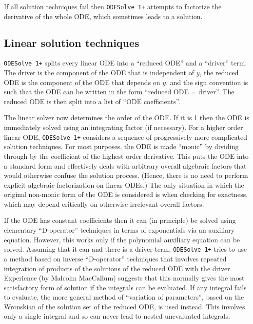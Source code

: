 \documentclass[a4paper]{article} %
\newcommand{\ODESolve}[1]{\texttt{ODESolve\,#1}}
\begin{document}
If all solution techniques fail then \ODESolve{1+} attempts to
factorize the derivative of the whole ODE, which sometimes leads to a
solution.


\subsection{Linear solution techniques}

\ODESolve{1+} splits every linear ODE into a ``reduced ODE'' and a
``driver'' term.  The driver is the component of the ODE that is
independent of $y$, the reduced ODE is the component of the ODE that
depends on $y$, and the sign convention is such that the ODE can be
written in the form ``reduced ODE = driver''.  The reduced ODE is then
split into a list of ``ODE coefficients''.

The linear solver now determines the order of the ODE\@.  If it is 1
then the ODE is immediately solved using an integrating factor (if
necessary).  For a higher order linear ODE, \ODESolve{1+} considers a
sequence of progressively more complicated solution techniques.  For
most purposes, the ODE is made ``monic'' by dividing through by the
coefficient of the highest order derivative.  This puts the ODE into a
standard form and effectively deals with arbitrary overall algebraic
factors that would otherwise confuse the solution process.  (Hence,
there is no need to perform explicit algebraic factorization on linear
ODEs.)  The only situation in which the original non-monic form of the
ODE is considered is when checking for exactness, which may depend
critically on otherwise irrelevant overall factors.

If the ODE has constant coefficients then it can (in principle) be
solved using elementary ``D-operator'' techniques in terms of
exponentials via an auxiliary equation.  However, this works only if
the polynomial auxiliary equation can be solved.  Assuming that it can
and there is a driver term, \ODESolve{1+} tries to use a method based
on inverse ``D-operator'' techniques that involves repeated
integration of products of the solutions of the reduced ODE with the
driver.  Experience (by Malcolm MacCallum) suggests that this normally
gives the most satisfactory form of solution if the integrals can be
evaluated.  If any integral fails to evaluate, the more general method
of ``variation of parameters'', based on the Wronskian of the solution
set of the reduced ODE, is used instead.  This involves only a single
integral and so can never lead to nested unevaluated integrals.
\end{document}

